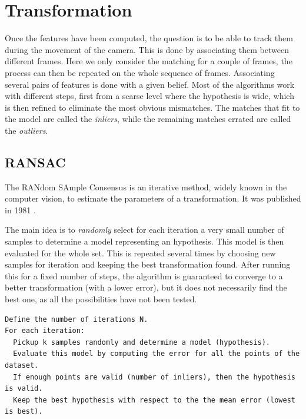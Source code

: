 \section{Transformation}

Once the features have been computed, the question is to be able to track them during the movement of the camera. This is done by associating them between different frames. Here we only consider the matching for a couple of frames, the process can then be repeated on the whole sequence of frames. Associating several pairs of features is done with a given belief. Most of the algorithms work with different steps, first from a scarse level where the hypothesis is wide, which is then refined to eliminate the most obvious mismatches. The matches that fit to the model are called the \emph{inliers}, while the remaining matches errated are called the \emph{outliers}.

\subsection{RANSAC}
\label{sub:ransac}

The RANdom SAmple Consensus is an iterative method, widely known in the computer vision, to estimate the parameters of a transformation. It was published in 1981 \cite{FischlerB81}.

The main idea is to \emph{randomly} select for each iteration a very small number of samples to determine a model representing an hypothesis. This model is then evaluated for the whole set. This is repeated several times by choosing new samples for iteration and keeping the best transformation found. After running this for a fixed number of steps, the algorithm is guaranteed to converge to a better transformation (with a lower error), but it does not necessarily find the best one, as all the possibilities have not been tested. 

\begin{verbatim}
Define the number of iterations N.
For each iteration:
  Pickup k samples randomly and determine a model (hypothesis).
  Evaluate this model by computing the error for all the points of the dataset.
  If enough points are valid (number of inliers), then the hypothesis is valid.
  Keep the best hypothesis with respect to the the mean error (lowest is best).
\end{verbatim}

